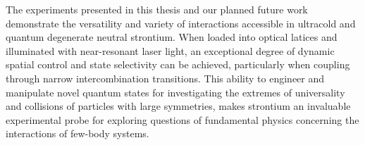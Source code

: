 
The experiments presented in this thesis and our planned future work demonstrate the versatility and variety of interactions accessible in ultracold and quantum degenerate neutral strontium.
When loaded into optical latices and illuminated with near-resonant laser light, an exceptional degree of dynamic spatial control and state selectivity can be achieved, particularly when coupling through narrow intercombination transitions.
This ability to engineer and manipulate novel quantum states for investigating the extremes of universality and collisions of particles with large symmetries, makes strontium an invaluable experimental probe for exploring questions of fundamental physics concerning the interactions of few-body systems.



%



